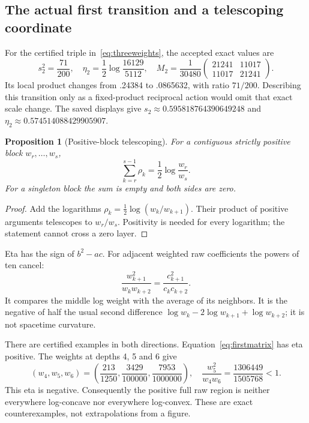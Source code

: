 \documentclass[11pt,a4paper]{article}
\newtheorem{proposition}[theorem]{Proposition}
\begin{document}
\clearpage
\subsection{The actual first transition and a telescoping coordinate}
\label{sec:telescoping}
For the certified triple in~\eqref{eq:threeweights}, the accepted exact values are
\begin{equation}
s_2^2=\frac{71}{200},\quad
\eta_2=\frac12\log\frac{16129}{5112},\quad
M_2=\frac1{30480}\begin{pmatrix}21241&11017\\11017&21241\end{pmatrix}.
\label{eq:firstmatrix}
\end{equation}
Its local product changes from .24384 to .0865632, with ratio $71/200$. Describing this transition only as a fixed-product reciprocal action would omit that exact scale change. The saved displays give $s_2\approx0.595818764390649248$ and $\eta_2\approx0.574514088429905907$.

\begin{proposition}[Positive-block telescoping]
For a contiguous strictly positive block $w_r,\ldots,w_s$,
\begin{equation}
\sum_{k=r}^{s-1}\rho_k=\frac12\log\frac{w_r}{w_s}.
\label{eq:telescoping}
\end{equation}
For a singleton block the sum is empty and both sides are zero.
\end{proposition}
\begin{proof}
Add the logarithms $\rho_k=\tfrac12\log(w_k/w_{k+1})$. Their product of positive arguments telescopes to $w_r/w_s$. Positivity is needed for every logarithm; the statement cannot cross a zero layer.
\end{proof}

Eta has the sign of $b^2-ac$. For adjacent weighted raw coefficients the powers of ten cancel:
\begin{equation}
\frac{w_{k+1}^2}{w_kw_{k+2}}
=\frac{c_{k+1}^2}{c_kc_{k+2}}.
\label{eq:etasign}
\end{equation}
It compares the middle log weight with the average of its neighbors. It is the negative of half the usual second difference $\log w_k-2\log w_{k+1}+\log w_{k+2}$; it is not spacetime curvature.

There are certified examples in both directions. Equation~\eqref{eq:firstmatrix} has eta positive. The weights at depths 4, 5 and 6 give
\begin{equation}
(w_4,w_5,w_6)=\left(\frac{213}{1250},\frac{3429}{100000},\frac{7953}{1000000}\right),
\quad \frac{w_5^2}{w_4w_6}=\frac{1306449}{1505768}<1.
\label{eq:negativeeta}
\end{equation}
This eta is negative. Consequently the positive full raw region is neither everywhere log-concave nor everywhere log-convex. These are exact counterexamples, not extrapolations from a figure.
\end{document}
